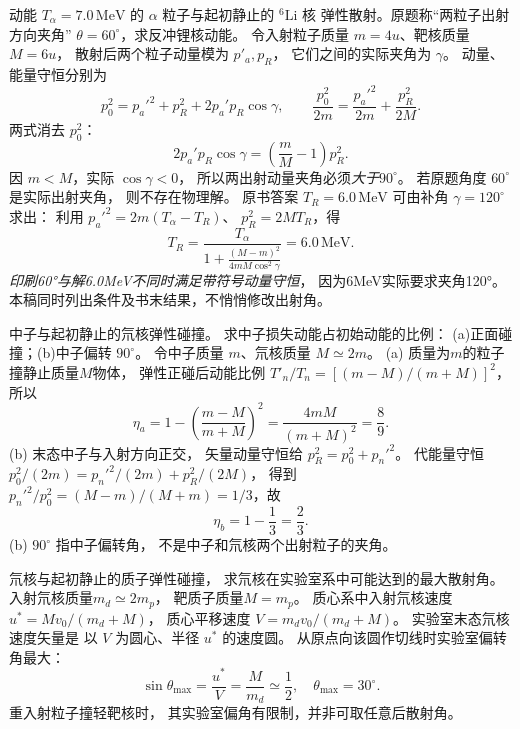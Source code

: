 动能 $T_\alpha=7.0\,\mathrm{MeV}$ 的
$\alpha$ 粒子与起初静止的 $\mathrm{^{6}Li}$ 核
弹性散射。原题称“两粒子出射方向夹角”
$\theta=60^\circ$，求反冲锂核动能。
\exsolution
令入射粒子质量 $m=4u$、靶核质量 $M=6u$，
散射后两个粒子动量模为 $p'_a,p_R$，
它们之间的实际夹角为 $\gamma$。
动量、能量守恒分别为
\[
 p_0^2=p_a'^2+p_R^2+2p_a'p_R\cos\gamma,
 \qquad
 \frac{p_0^2}{2m}=
 \frac{p_a'^2}{2m}+\frac{p_R^2}{2M}.
\]
两式消去 $p_0^2$：
\[
 2p_a'p_R\cos\gamma=
 \left(\frac mM-1\right)p_R^2.
\]
因 $m<M$，实际 $\cos\gamma<0$，
所以两出射动量夹角必须\emph{大于}$90^\circ$。
若原题角度 $60^\circ$ 是实际出射夹角，
则不存在物理解。
原书答案 $T_R=6.0\,\mathrm{MeV}$ 可由补角
$\gamma=120^\circ$ 求出：
利用
$p_a'^2=2m(T_\alpha-T_R)$、
$p_R^2=2MT_R$，得
\[
 \boxed{T_R=
 \frac{T_\alpha}{1+
 \frac{(M-m)^2}{4mM\cos^2\gamma}}=
 6.0\,\mathrm{MeV}}.
\]
\excheck \emph{印刷60°与解6.0MeV不同时满足带符号动量守恒}，
因为6MeV实际要求夹角120°。
本稿同时列出条件及书末结果，不悄悄修改出射角。

中子与起初静止的氘核弹性碰撞。
求中子损失动能占初始动能的比例：
(a)正面碰撞；(b)中子偏转 $90^\circ$。
\exsolution
令中子质量 $m$、氘核质量 $M\simeq2m$。
(a) 质量为$m$的粒子撞静止质量$M$物体，
弹性正碰后动能比例
$T'_n/T_n=[(m-M)/(m+M)]^2$，
所以
\[
 \boxed{\eta_a=
 1-\left(\frac{m-M}{m+M}\right)^2
 =\frac{4mM}{(m+M)^2}=\frac89}.
\]
(b) 末态中子与入射方向正交，
矢量动量守恒给
$p_R^2=p_0^2+p_n'^2$。
代能量守恒
$p_0^2/(2m)=p_n'^2/(2m)+p_R^2/(2M)$，
得到
$p_n'^2/p_0^2=(M-m)/(M+m)=1/3$，故
\[
 \boxed{\eta_b=1-\frac13=\frac23}.
\]
\excheck (b) $90^\circ$ 指中子偏转角，
不是中子和氘核两个出射粒子的夹角。

氘核与起初静止的质子弹性碰撞，
求氘核在实验室系中可能达到的最大散射角。
\exsolution
入射氘核质量$m_d\simeq2m_p$，
靶质子质量$M=m_p$。
质心系中入射氘核速度
$u^*=Mv_0/(m_d+M)$，
质心平移速度
$V=m_dv_0/(m_d+M)$。
实验室末态氘核速度矢量是
以 $V$ 为圆心、半径 $u^*$ 的速度圆。
从原点向该圆作切线时实验室偏转角最大：
\[
 \boxed{\sin\theta_{\max}=\frac{u^*}{V}
 =\frac M{m_d}\simeq\frac12},
 \quad
 \boxed{\theta_{\max}=30^\circ}.
\]
\excheck 重入射粒子撞轻靶核时，
其实验室偏角有限制，并非可取任意后散射角。

